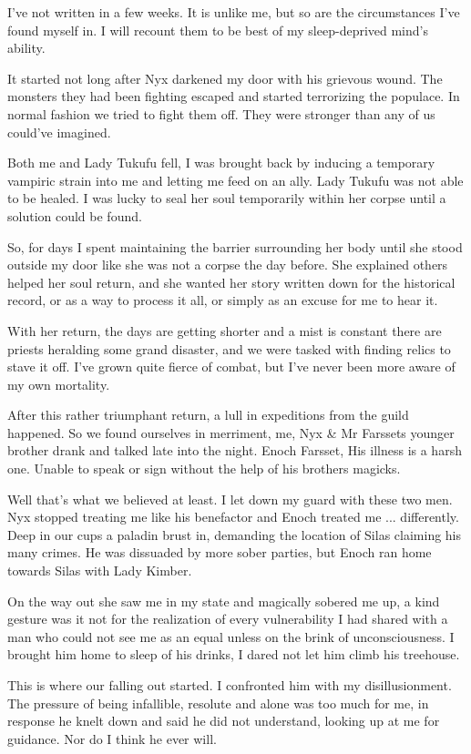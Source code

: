 \documentclass{article}
\begin{document}
I've not written in a few weeks. It is unlike me, but so are the circumstances I've found myself in. I will recount them to be best of my sleep-deprived mind's ability.

It started not long after Nyx darkened my door with his grievous wound. The monsters they had been fighting escaped and started terrorizing the populace. In normal fashion we tried to fight them off. They were stronger than any of us could've imagined.

Both me and Lady Tukufu fell, I was brought back by inducing a temporary vampiric strain into me and letting me feed on an ally. Lady Tukufu was not able to be healed. I was lucky to seal her soul temporarily within her corpse until a solution could be found.

So, for days I spent maintaining the barrier surrounding her body until she stood outside my door like she was not a corpse the day before. She explained others helped her soul return, and she wanted her story written down for the historical record, or as a way to process it all, or simply as an excuse for me to hear it.

With her return, the days are getting shorter and a mist is constant there are priests heralding some grand disaster, and we were tasked with finding relics to stave it off. I've grown quite fierce of combat, but I've never been more aware of my own mortality.

After this rather triumphant return, a lull in expeditions from the guild happened. So we found ourselves in merriment, me, Nyx \& Mr Farssets younger brother drank and talked late into the night. Enoch Farsset, His illness is a harsh one. Unable to speak or sign without the help of his brothers magicks.

Well that's what we believed at least. I let down my guard with these two men. Nyx stopped treating me like his benefactor and Enoch treated me ... differently. Deep in our cups a paladin brust in, demanding the location of Silas claiming his many crimes. He was dissuaded by more sober parties, but Enoch ran home towards Silas with Lady Kimber.

On the way out she saw me in my state and magically sobered me up, a kind gesture was it not for the realization of every vulnerability I had shared with a man who could not see me as an equal unless on the brink of unconsciousness. I brought him home to sleep of his drinks, I dared not let him climb his treehouse.

This is where our falling out started. I confronted him with my disillusionment. The pressure of being infallible, resolute and alone was too much for me, in response he knelt down and said he did not understand, looking up at me for guidance. Nor do I think he ever will.
\end{document}
